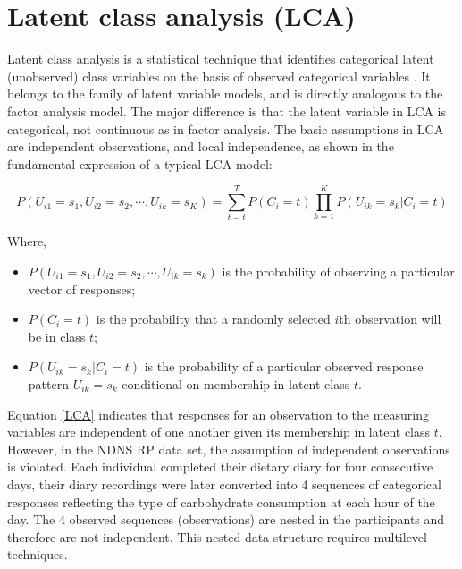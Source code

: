 \section{Latent class analysis (LCA)}\vspace{-0.3cm}

Latent class analysis is a statistical technique that identifies categorical latent (unobserved) class variables on the basis of observed categorical variables \parencite{collins2010latent}. It belongs to the family of latent variable models, and is directly analogous to the factor analysis model. The major difference is that the latent variable in LCA is categorical, not continuous as in factor analysis. The basic assumptions in LCA are independent observations, and local independence, as shown in the fundamental expression of a typical LCA model: \vspace{-0.8cm}

\begin{equation}
P(U_{i1} = s_1, U_{i2} = s_2, \cdots, U_{ik} = s_K) = \sum_{t=t}^{T}P(C_i = t)\prod_{k = 1}^{K}P(U_{ik} = s_k | C_i = t)
\label{LCA}
\end{equation}\vspace{-0.7cm}

Where, 

\begin{itemize}
	\item $P(U_{i1} = s_1, U_{i2} = s_2, \cdots, U_{ik} = s_k)$ is the probability of observing a particular vector of responses;
	\item $P(C_i = t)$ is the probability that a randomly selected $i$th observation will be in class $t$;
	\item $P(U_{ik} = s_k | C_i = t)$ is the probability of a particular observed response pattern $U_{ik} = s_k$ conditional on membership in latent class $t$.
\end{itemize}


Equation \ref{LCA} indicates that responses for an observation to the measuring variables are independent of one another given its membership in latent class $t$. However, in the NDNS RP data set, the assumption of independent observations is violated. Each individual completed their dietary diary for four consecutive days, their diary recordings were later converted into 4 sequences of categorical responses reflecting the type of carbohydrate consumption at each hour of the day. The 4 observed sequences (observations) are nested in the participants and therefore are not independent. This nested data structure requires multilevel techniques. 
\vspace{-0.3cm}

